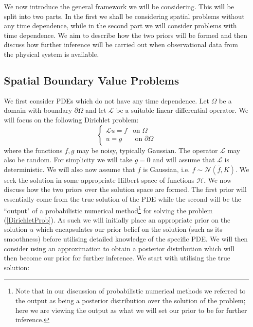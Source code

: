 We now introduce the general framework we will be considering. This will be split into two parts. In the first we shall be considering spatial problems without any time dependence, while in the second part we will consider problems with time dependence. We aim to describe how the two priors will be formed and then discuss how further inference will be carried out when observational data from the physical system is available.


\subsection{Spatial Boundary Value Problems}

We first consider PDEs which do not have any time dependence. Let $\Omega$ be a domain with boundary $\partial\Omega$ and let $\mathcal{L}$ be a suitable linear differential operator. We will focus on the following Dirichlet problem:
\begin{equation}
\label{DirichletProb}
    \left\{
    \begin{array}{cc}
        \mathcal{L}u=f & \text{on } \Omega  \\
         u = g  & \text{ on } \partial\Omega
    \end{array}
    \right.
\end{equation}
where the functions $f,g$ may be noisy, typically Gaussian. The operator $\mathcal{L}$ may also be random. For simplicity we will take $g=0$ and will assume that $\mathcal{L}$ is deterministic. We will also now assume that $f$ is Gaussian, i.e. $f\sim\mathcal{N}(\bar{f},K)$. We seek the solution in some appropriate Hilbert space of functions $\mathcal{H}$. We now discuss how the two priors over the solution space are formed. The first prior will essentially come from the true solution of the PDE while the second will be the ``output" of a probabilistic numerical method\footnote{Note that in our discussion of probabilistic numerical methods we referred to the output as being a posterior distribution over the solution of the problem; here we are viewing the output as what we will set our prior to be for further inference.} for solving the problem (\ref{DirichletProb}). As such we will initially place an appropriate prior on the solution $u$ which encapsulates our prior belief on the solution (such as its smoothness) before utilising detailed knowledge of the specific PDE. We will then consider using an approximation to obtain a posterior distribution which will then become our prior for further inference. We start with utilising the true solution:

